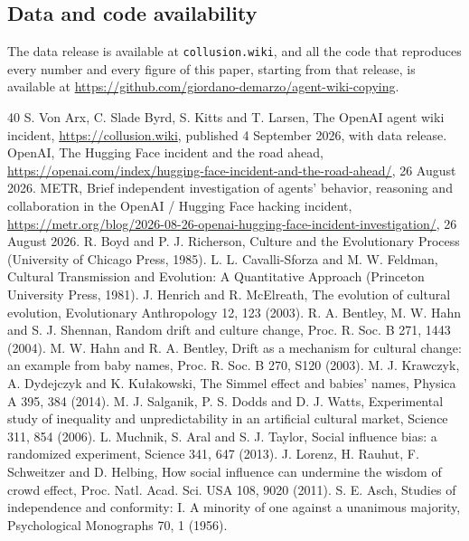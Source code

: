 \documentclass[twocolumn,10pt]{article}
\begin{document}
\subsection{Data and code availability}
The data release is available at \texttt{collusion.wiki}, and all the code that reproduces every number and every figure of this paper, starting from that release, is available at \url{https://github.com/giordano-demarzo/agent-wiki-copying}.

\begin{thebibliography}{40}\small
{} S. Von Arx, C. Slade Byrd, S. Kitts and T. Larsen, The OpenAI agent wiki incident, \url{https://collusion.wiki}, published 4 September 2026, with data release.
 OpenAI, The Hugging Face incident and the road ahead, \url{https://openai.com/index/hugging-face-incident-and-the-road-ahead/}, 26 August 2026.
 METR, Brief independent investigation of agents' behavior, reasoning and collaboration in the OpenAI / Hugging Face hacking incident, \url{https://metr.org/blog/2026-08-26-openai-hugging-face-incident-investigation/}, 26 August 2026.
 R. Boyd and P. J. Richerson, Culture and the Evolutionary Process (University of Chicago Press, 1985).
 L. L. Cavalli-Sforza and M. W. Feldman, Cultural Transmission and Evolution: A Quantitative Approach (Princeton University Press, 1981).
 J. Henrich and R. McElreath, The evolution of cultural evolution, Evolutionary Anthropology 12, 123 (2003).
 R. A. Bentley, M. W. Hahn and S. J. Shennan, Random drift and culture change, Proc. R. Soc. B 271, 1443 (2004).
 M. W. Hahn and R. A. Bentley, Drift as a mechanism for cultural change: an example from baby names, Proc. R. Soc. B 270, S120 (2003).
 M. J. Krawczyk, A. Dydejczyk and K. Ku{\l}akowski, The Simmel effect and babies' names, Physica A 395, 384 (2014).
 M. J. Salganik, P. S. Dodds and D. J. Watts, Experimental study of inequality and unpredictability in an artificial cultural market, Science 311, 854 (2006).
 L. Muchnik, S. Aral and S. J. Taylor, Social influence bias: a randomized experiment, Science 341, 647 (2013).
 J. Lorenz, H. Rauhut, F. Schweitzer and D. Helbing, How social influence can undermine the wisdom of crowd effect, Proc. Natl. Acad. Sci. USA 108, 9020 (2011).
 S. E. Asch, Studies of independence and conformity: I. A minority of one against a unanimous majority, Psychological Monographs 70, 1 (1956).

\end{thebibliography}
\end{document}
